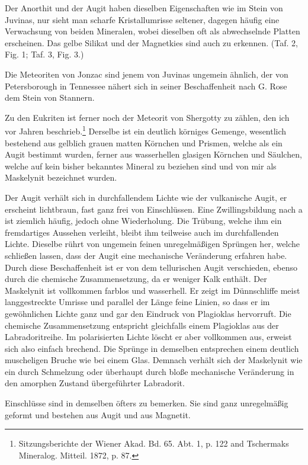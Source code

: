\documentclass[a4paper, 12pt, oneside]{article}
\begin{document}
Der Anorthit und der Augit haben dieselben Eigenschaften wie im Stein von Juvinas, nur sieht man scharfe Kristallumrisse seltener, dagegen häufig eine Verwachsung von beiden Mineralen, wobei dieselben oft als abwechselnde Platten erscheinen. Das gelbe Silikat und der Magnetkies sind auch zu erkennen. (Taf. 2, Fig. 1; Taf. 3, Fig. 3.)

Die Meteoriten von Jonzac sind jenem von Juvinas ungemein ähnlich, der von Petersborough in Tennessee nähert sich in seiner Beschaffenheit nach G. Rose dem Stein von Stannern.

Zu den Eukriten ist ferner noch der Meteorit von Shergotty zu zählen, den ich vor Jahren beschrieb.\footnote{Sitzungsberichte der Wiener Akad. Bd. 65. Abt. 1, p. 122 and Tschermaks Mineralog. Mitteil. 1872, p. 87.} Derselbe ist ein deutlich körniges Gemenge, wesentlich bestehend aus gelblich grauen matten Körnchen und Prismen, welche als ein Augit bestimmt wurden, ferner aus wasserhellen glasigen Körnchen und Säulchen, welche auf kein bisher bekanntes Mineral zu beziehen sind und von mir als Maskelynit bezeichnet wurden.

Der Augit verhält sich in durchfallendem Lichte wie der vulkanische Augit, er erscheint lichtbraun, fast ganz frei von Einschlüssen. Eine Zwillingsbildung nach a ist ziemlich häufig, jedoch ohne Wiederholung. Die Trübung, welche ihm ein fremdartiges Aussehen verleiht, bleibt ihm teilweise auch im durchfallenden Lichte. Dieselbe rührt von ungemein feinen unregelmäßigen Sprüngen her, welche schließen lassen, dass der Augit eine mechanische Veränderung erfahren habe. Durch diese Beschaffenheit ist er von dem tellurischen Augit verschieden, ebenso durch die chemische Zusammensetzung, da er weniger Kalk enthält. Der Maskelynit ist vollkommen farblos und wasserhell. Er zeigt im Dünnschliffe meist langgestreckte Umrisse und parallel der Länge feine Linien, so dass er im gewöhnlichen Lichte ganz und gar den Eindruck von Plagioklas hervorruft. Die chemische Zusammensetzung entspricht gleichfalls einem Plagioklas aus der Labradoritreihe. Im polarisierten Lichte löscht er aber vollkommen aus, erweist sich also einfach brechend. Die Sprünge in demselben entsprechen einem deutlich muscheligen Bruche wie bei einem Glas. Demnach verhält sich der Maskelynit wie ein durch Schmelzung oder überhaupt durch bloße mechanische Veränderung in den amorphen Zustand übergeführter Labradorit.

Einschlüsse sind in demselben öfters zu bemerken. Sie sind ganz unregelmäßig geformt und bestehen aus Augit und aus Magnetit.
\end{document}
